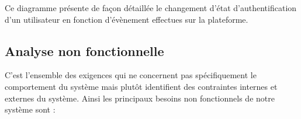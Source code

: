 \begin{itemize}
	Ce diagramme présente de façon détaillée le changement d’état d’authentification d’un utilisateur en fonction d’évènement effectues sur la plateforme.  
\end{itemize}

\subsection{Analyse non fonctionnelle} %

C’est l’ensemble des exigences qui ne concernent pas spécifiquement le comportement du système mais plutôt identifient des contraintes internes et externes du système. Ainsi les principaux besoins non fonctionnels de notre système sont : 